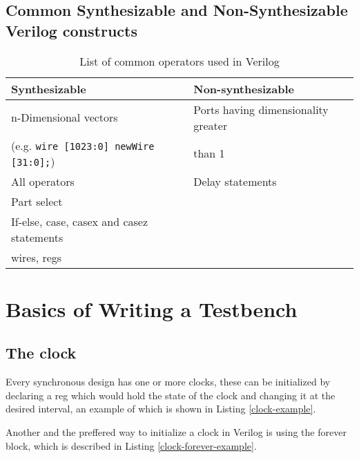 \documentclass[a4paper,10pt]{article}
\theoremstyle{mytheor}
\newcommand{
  \insertverilog}[3]{
  
}
\begin{document}
\subsection{Common Synthesizable and Non-Synthesizable Verilog constructs}
\begin{table}[h]
  \begin{center}
    \label{Table:operators-table}
    \caption{List of common operators used in Verilog}
    \renewcommand{\arraystretch}{1.1}
    \begin{tabularx}{\textwidth}{|X|X|}
      \hline
      \rowcolor{greatblue}
      \color{white}Synthesizable & \color{white}Non-synthesizable \\
      \hline
      n-Dimensional vectors & Ports having dimensionality greater\\
      (e.g. \lstinline[style=verilog-inline-style]{wire [1023:0] newWire [31:0];}) & than 1 \\
      \hline
      All operators & Delay statements \\
      \hline
      Part select & \\
      \hline
      If-else, case, casex and casez statements & \\
      \hline
      wires, regs & \\
      \hline
    \end{tabularx}
  \end{center}
\end{table}

\section{Basics of Writing a Testbench}
\subsection{The clock}
Every synchronous design has one or more clocks, these can be
initialized by declaring a reg which would hold the state of the clock
and changing it at the desired interval, an example of which is shown
in Listing \ref{clock-example}.

\insertverilog
    {./verilog_files/clockExample.v}
    {clock-example}
    {\text{Example clock of time period 15 ns.}}


Another and the preffered way to initialize a clock in Verilog is
using the forever block, which is described in Listing
\ref{clock-forever-example}.

\insertverilog
    {./verilog_files/clockForeverExample.v}
    {clock-forever-example}
    {\text{Example clock of time period 15 ns using forever statement.}}
\end{document}
